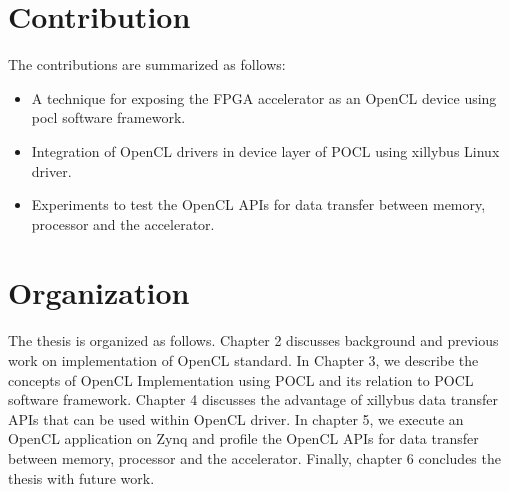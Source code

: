 \section{Contribution}
The contributions are summarized as follows:
\begin{itemize} 
	\item A technique for exposing the FPGA accelerator as an OpenCL device using pocl software framework.
	\item Integration of OpenCL drivers in device layer of POCL using xillybus Linux driver.
	\item Experiments to test the OpenCL APIs for data transfer between memory, processor and the accelerator.
\end{itemize}

\section{Organization}
The thesis is organized as follows. Chapter 2 discusses background and previous work on implementation of OpenCL standard. In Chapter 3, we describe the concepts of OpenCL Implementation using POCL and its relation to POCL software framework. Chapter 4 discusses the advantage of xillybus data transfer APIs that can be used within OpenCL driver. In chapter 5, we execute an OpenCL application on Zynq and profile the OpenCL APIs for data transfer between memory, processor and the accelerator. Finally, chapter 6 concludes the thesis with future work.